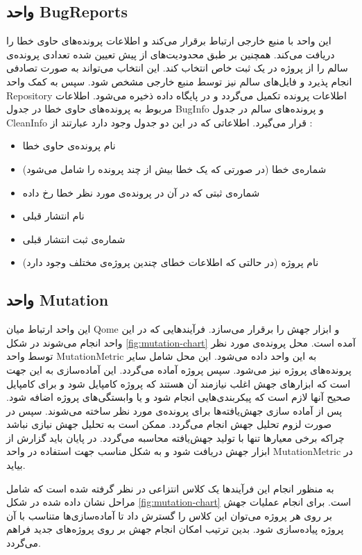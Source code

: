 \subsection{واحد BugReports  }
این واحد با منبع خارجی ارتباط برقرار می‌کند و اطلاعات پرونده‌های حاوی خطا را دریافت می‌کند. همچنین بر طبق محدودیت‌های از پیش تعیین شده تعدادی پرونده‌ی سالم را از پروژه در یک ثبت خاص انتخاب کند. این انتخاب می‌تواند به صورت تصادفی انجام پذیرد و فایل‌های سالم نیز توسط منبع خارجی مشخص شود. سپس به کمک واحد Repository اطلاعات پرونده تکمیل می‌گردد و در پایگاه داده ذخیره می‌شود. اطلاعات مربوط به پرونده‌های حاوی خطا در جدول BugInfo و پرونده‌های سالم در جدول CleanInfo  قرار می‌گیرد. اطلاعاتی که در این دو جدول وجود دارد عبارتند از :
\begin{itemize}
	\item 
	نام پرونده‌ی حاوی خطا
	\item
	شماره‌ی خطا (در صورتی که یک خطا بیش از چند پرونده را شامل می‌شود)
	\item
	شماره‌ی ثبتی که در آن در پرونده‌ی مورد نظر خطا رخ داده
	\item
	نام انتشار قبلی
	\item
	شماره‌ی ثبت انتشار قبلی
	\item 
	نام پروژه (در حالتی که اطلاعات خطای چندین پروژه‌ی مختلف وجود دارد)
\end{itemize}

\subsection{واحد Mutation}
این واحد ارتباط میان Qome و ابزار جهش را برقرار می‌سازد. فرآیندهایی که در این واحد انجام می‌شوند در شکل \ref{fig:mutation-chart} آمده است. محل پرونده‌ی مورد نظر توسط واحد MutationMetric به این واحد داده می‌شود. این محل شامل سایر پرونده‌های پروژه نیز می‌شود. سپس پروژه آماده می‌گردد. این آماده‌سازی به این جهت است که ابزارهای جهش اغلب نیازمند آن هستند که پروژه کامپایل شود و برای  کامپایل صحیح آنها لازم است که پیکربندی‌هایی انجام شود و یا وابستگی‌های پروژه اضافه شود. پس از آماده سازی جهش‌یافته‌ها برای پرونده‌ی مورد نظر ساخته می‌شوند. سپس در صورت لزوم تحلیل جهش انجام می‌گردد. ممکن است به تحلیل جهش نیازی نباشد چراکه برخی معیارها تنها با تولید جهش‌یافته محاسبه می‌گردد. در پایان باید گزارش از ابزار جهش دریافت شود و به شکل مناسب جهت استفاده در واحد MutationMetric در بیاید. 

به منظور انجام این فرآیندها یک کلاس انتزاعی در نظر گرفته شده است که شامل مراحل نشان داده شده در شکل \ref{fig:mutation-chart}  است. برای انجام عملیات جهش بر روی هر پروژه می‌توان این کلاس را گسترش داد تا آماده‌سازی‌ها متناسب با آن پروژه پیاده‌سازی شود. بدین ترتیب امکان انجام جهش بر روی پروژه‌های جدید فراهم می‌گردد.

